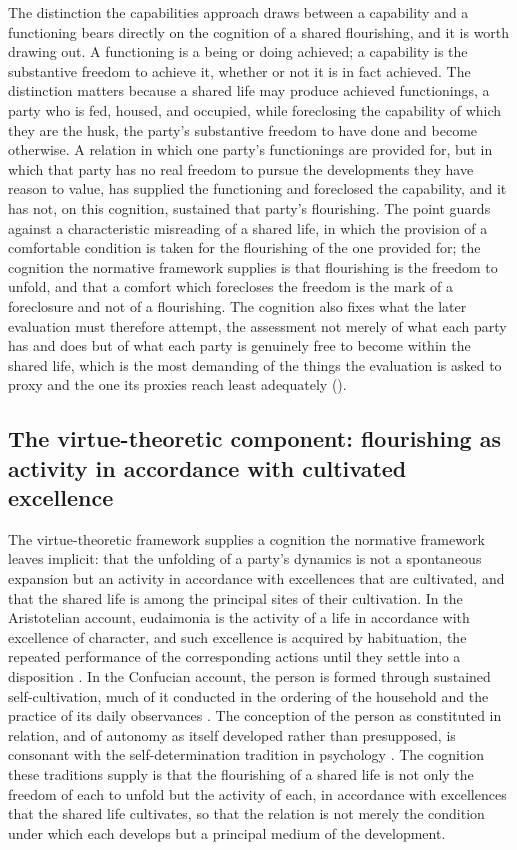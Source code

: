 The distinction the capabilities approach draws between a capability and a functioning bears directly on the cognition of a shared flourishing, and it is worth drawing out. A functioning is a being or doing achieved; a capability is the substantive freedom to achieve it, whether or not it is in fact achieved. The distinction matters because a shared life may produce achieved functionings, a party who is fed, housed, and occupied, while foreclosing the capability of which they are the husk, the party's substantive freedom to have done and become otherwise. A relation in which one party's functionings are provided for, but in which that party has no real freedom to pursue the developments they have reason to value, has supplied the functioning and foreclosed the capability, and it has not, on this cognition, sustained that party's flourishing. The point guards against a characteristic misreading of a shared life, in which the provision of a comfortable condition is taken for the flourishing of the one provided for; the cognition the normative framework supplies is that flourishing is the freedom to unfold, and that a comfort which forecloses the freedom is the mark of a foreclosure and not of a flourishing. The cognition also fixes what the later evaluation must therefore attempt, the assessment not merely of what each party has and does but of what each party is genuinely free to become within the shared life, which is the most demanding of the things the evaluation is asked to proxy and the one its proxies reach least adequately ().

\subsection{The virtue-theoretic component: flourishing as activity in accordance with cultivated excellence}
\label{p11:sec:cog-virtue}

The virtue-theoretic framework supplies a cognition the normative framework leaves implicit: that the unfolding of a party's dynamics is not a spontaneous expansion but an activity in accordance with excellences that are cultivated, and that the shared life is among the principal sites of their cultivation. In the Aristotelian account, eudaimonia is the activity of a life in accordance with excellence of character, and such excellence is acquired by habituation, the repeated performance of the corresponding actions until they settle into a disposition \parencite{aristotle2009}. In the Confucian account, the person is formed through sustained self-cultivation, much of it conducted in the ordering of the household and the practice of its daily observances \parencite{tu1985}. The conception of the person as constituted in relation, and of autonomy as itself developed rather than presupposed, is consonant with the self-determination tradition in psychology \parencite{ryan2000}. The cognition these traditions supply is that the flourishing of a shared life is not only the freedom of each to unfold but the activity of each, in accordance with excellences that the shared life cultivates, so that the relation is not merely the condition under which each develops but a principal medium of the development.

